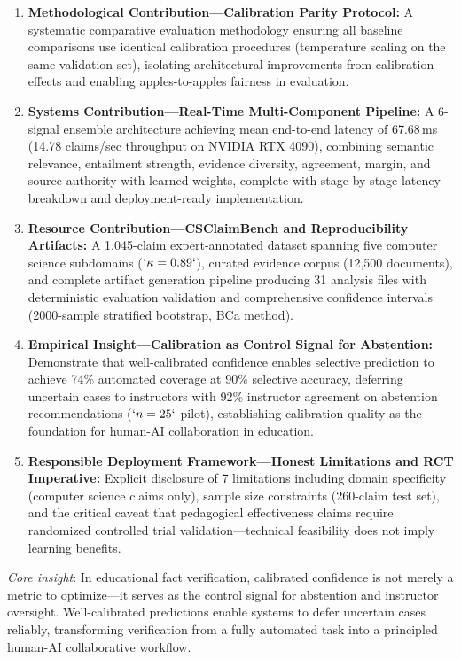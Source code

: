 \begin{enumerate}
\def\labelenumi{\arabic{enumi}.}
\item
  \textbf{Methodological Contribution---Calibration Parity Protocol:} A systematic comparative evaluation methodology ensuring all baseline comparisons use identical calibration procedures (temperature scaling on the same validation set), isolating architectural improvements from calibration effects and enabling apples-to-apples fairness in evaluation.
\item
  \textbf{Systems Contribution---Real-Time Multi-Component Pipeline:} A 6-signal ensemble architecture achieving mean end-to-end latency of 67.68 ms (14.78 claims/sec throughput on NVIDIA RTX 4090), combining semantic relevance, entailment strength, evidence diversity, agreement, margin, and source authority with learned weights, complete with stage-by-stage latency breakdown and deployment-ready implementation.
\item
  \textbf{Resource Contribution---CSClaimBench and Reproducibility Artifacts:} A 1,045-claim expert-annotated dataset spanning five computer science subdomains (\(`\kappa=0.89`\)), curated evidence corpus (12,500 documents), and complete artifact generation pipeline producing 31 analysis files with deterministic evaluation validation and comprehensive confidence intervals (2000-sample stratified bootstrap, BCa method).
\item
  \textbf{Empirical Insight---Calibration as Control Signal for Abstention:} Demonstrate that well-calibrated confidence enables selective prediction to achieve 74\% automated coverage at 90\% selective accuracy, deferring uncertain cases to instructors with 92\% instructor agreement on abstention recommendations (\(`n=25`\) pilot), establishing calibration quality as the foundation for human-AI collaboration in education.
\item
  \textbf{Responsible Deployment Framework---Honest Limitations and RCT Imperative:} Explicit disclosure of 7 limitations including domain specificity (computer science claims only), sample size constraints (260-claim test set), and the critical caveat that pedagogical effectiveness claims require randomized controlled trial validation---technical feasibility does not imply learning benefits.
\end{enumerate}

\emph{Core insight}: In educational fact verification, calibrated confidence is not merely a metric to optimize---it serves as the control signal for abstention and instructor oversight. Well-calibrated predictions enable systems to defer uncertain cases reliably, transforming verification from a fully automated task into a principled human-AI collaborative workflow.

